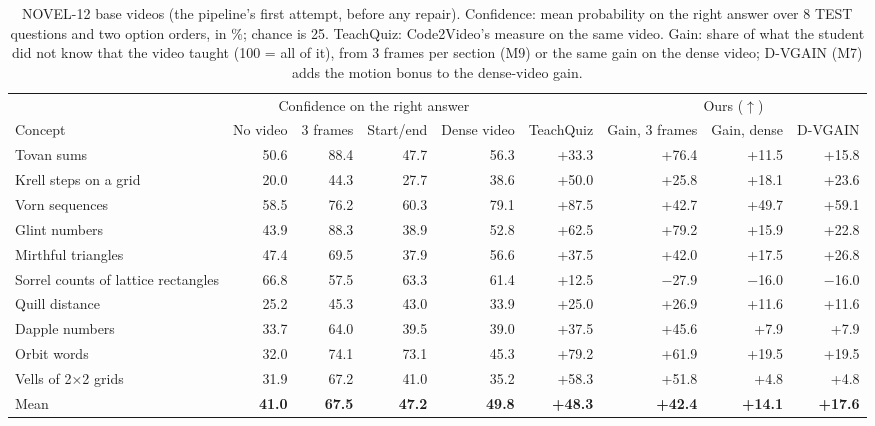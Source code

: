 \begin{table}[t]\centering\footnotesize\setlength{\tabcolsep}{4pt}
\caption{NOVEL-12 base videos (the pipeline's first attempt, before any repair). Confidence: mean probability on the right answer over 8 TEST questions and two option orders, in \%; chance is 25. TeachQuiz: Code2Video's measure on the same video. Gain: share of what the student did not know that the video taught (100 = all of it), from 3 frames per section (M9) or the same gain on the dense video; D-VGAIN (M7) adds the motion bonus to the dense-video gain.}\label{tab:novel_first}
\begin{tabular}{lrrrrrrrr}\toprule & \multicolumn{4}{c}{Confidence on the right answer} & & \multicolumn{3}{c}{Ours ($\uparrow$)}\\
\cmidrule(lr){2-5}\cmidrule(lr){7-9}
Concept & No video & 3 frames & Start/end & Dense video & TeachQuiz & Gain, 3 frames & Gain, dense & D-VGAIN\\\midrule
Tovan sums & 50.6 & 88.4 & 47.7 & 56.3 & +33.3 & +76.4 & +11.5 & +15.8 \\
Krell steps on a grid & 20.0 & 44.3 & 27.7 & 38.6 & +50.0 & +25.8 & +18.1 & +23.6 \\
Vorn sequences & 58.5 & 76.2 & 60.3 & 79.1 & +87.5 & +42.7 & +49.7 & +59.1 \\
Glint numbers & 43.9 & 88.3 & 38.9 & 52.8 & +62.5 & +79.2 & +15.9 & +22.8 \\
Mirthful triangles & 47.4 & 69.5 & 37.9 & 56.6 & +37.5 & +42.0 & +17.5 & +26.8 \\
Sorrel counts of lattice rectangles & 66.8 & 57.5 & 63.3 & 61.4 & +12.5 & $-$27.9 & $-$16.0 & $-$16.0 \\
Quill distance & 25.2 & 45.3 & 43.0 & 33.9 & +25.0 & +26.9 & +11.6 & +11.6 \\
Dapple numbers & 33.7 & 64.0 & 39.5 & 39.0 & +37.5 & +45.6 & +7.9 & +7.9 \\
Orbit words & 32.0 & 74.1 & 73.1 & 45.3 & +79.2 & +61.9 & +19.5 & +19.5 \\
Vells of 2×2 grids & 31.9 & 67.2 & 41.0 & 35.2 & +58.3 & +51.8 & +4.8 & +4.8 \\
\midrule
Mean & \textbf{41.0} & \textbf{67.5} & \textbf{47.2} & \textbf{49.8} & \textbf{+48.3} & \textbf{+42.4} & \textbf{+14.1} & \textbf{+17.6} \\
\bottomrule\end{tabular}
\end{table}
